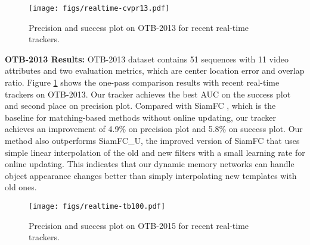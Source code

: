 \documentclass[runningheads]{llncs}
\begin{document}
\begin{figure}[t]
	\begin{center}
		\texttt{[image: figs/realtime-cvpr13.pdf]}
	\end{center}
	\caption{Precision and success plot on OTB-2013 for recent real-time trackers.
	}
	\label{fig:8}
\end{figure}

\textbf{OTB-2013 Results:} OTB-2013 \cite{Wu2013} dataset contains 51 sequences with 11 video attributes and two evaluation metrics, which are center location error and overlap ratio. Figure \ref{fig:8} shows the one-pass comparison results with recent real-time trackers on OTB-2013. Our tracker achieves the best AUC on the success plot and second place on precision plot. Compared with SiamFC \cite{Bertinetto2016}, which is the baseline for matching-based methods without online updating, our tracker 
achieves an improvement of 4.9\% on precision plot and 5.8\% on success plot.
Our method also outperforms SiamFC\_U, the improved version of SiamFC \cite{Valmadre2017} that uses simple linear interpolation of the old and new filters with a small learning rate for online updating. 
This indicates that our dynamic memory networks can handle object appearance changes better than simply interpolating new templates with old ones.


\begin{figure}[t]
	\begin{center}
		\texttt{[image: figs/realtime-tb100.pdf]}
	\end{center}
	\caption{Precision and success plot on OTB-2015 for recent real-time trackers.}
	\label{fig:9}
\end{figure}
\end{document}
